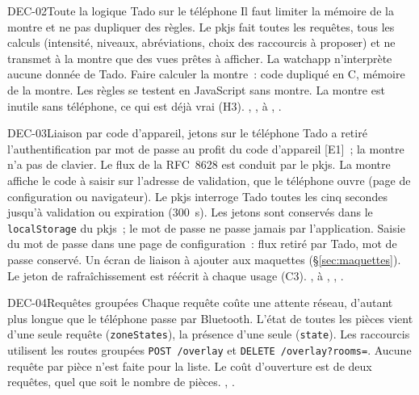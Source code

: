 \begin{decision}{DEC-02}{Toute la logique Tado sur le téléphone}
   Il faut limiter la mémoire de la montre et ne pas dupliquer des règles.
   Le pkjs fait toutes les requêtes, tous les calculs (intensité, niveaux,
  abréviations, choix des raccourcis à proposer) et ne transmet à la montre que des vues
  prêtes à afficher. La watchapp n'interprète aucune donnée de Tado.
   Faire calculer la montre~: code dupliqué en C, mémoire de la montre.
   Les règles se testent en JavaScript sans montre. La montre est
  inutile sans téléphone, ce qui est déjà vrai (H3).
   , ,  à
  , .
\end{decision}

\begin{decision}{DEC-03}{Liaison par code d'appareil, jetons sur le téléphone}
   Tado a retiré l'authentification par mot de passe au profit du code
  d'appareil [E1]~; la montre n'a pas de clavier.
   Le flux de la RFC~8628 est conduit par le pkjs. La montre affiche le code
  à saisir sur l'adresse de validation, que le téléphone ouvre (page de configuration ou
  navigateur). Le pkjs interroge Tado toutes les cinq secondes jusqu'à validation ou
  expiration (300~s). Les jetons sont conservés dans le \texttt{localStorage} du pkjs~; le
  mot de passe ne passe jamais par l'application.
   Saisie du mot de passe dans une page de configuration~: flux
  retiré par Tado, mot de passe conservé.
   Un écran de liaison à ajouter aux maquettes (§\ref{sec:maquettes}).
  Le jeton de rafraîchissement est réécrit à chaque usage (C3).
   ,  à ,
  , .
\end{decision}

\begin{decision}{DEC-04}{Requêtes groupées}
   Chaque requête coûte une attente réseau, d'autant plus longue que le téléphone passe par Bluetooth.
   L'état de toutes les pièces vient d'une seule requête (\texttt{zoneStates}), la
  présence d'une seule (\texttt{state}). Les raccourcis utilisent les routes groupées
  \texttt{POST /overlay} et \texttt{DELETE /overlay?rooms=}. Aucune requête par pièce n'est faite pour la liste.
   Le coût d'ouverture est de deux requêtes, quel que soit le nombre de pièces.
   , .
\end{decision}

